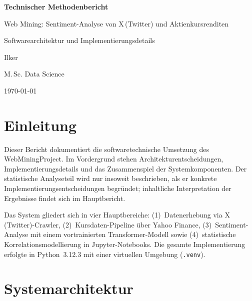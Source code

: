 \documentclass[11pt, a4paper]{article}
\begin{document}

\begin{titlepage}
  \centering
  \vspace*{2cm}
  {\LARGE\bfseries Technischer Methodenbericht\par}
  \vspace{0.8cm}
  {\large Web Mining: Sentiment-Analyse von X\,(Twitter) und Aktienkursrenditen\par}
  \vspace{0.6cm}
  {\normalsize Softwarearchitektur und Implementierungsdetails\par}
  \vspace{2cm}
  {\large Ilker\par}
  \vspace{0.4cm}
  {\normalsize M.\,Sc. Data Science\par}
  \vfill
  {\normalsize \today\par}
\end{titlepage}

\tableofcontents
\newpage

\section{Einleitung}
\label{sec:einleitung}

Dieser Bericht dokumentiert die softwaretechnische Umsetzung des WebMiningProject.
Im Vordergrund stehen Architekturentscheidungen, Implementierungsdetails und das
Zusammenspiel der Systemkomponenten. Der statistische Analyseteil wird nur insoweit
beschrieben, als er konkrete Implementierungsentscheidungen begründet; inhaltliche
Interpretation der Ergebnisse findet sich im Hauptbericht.

Das System gliedert sich in vier Hauptbereiche:
(1)~Datenerhebung via X\,(Twitter)-Crawler,
(2)~Kursdaten-Pipeline über Yahoo Finance,
(3)~Sentiment-Analyse mit einem vortrainierten Transformer-Modell sowie
(4)~statistische Korrelationsmodellierung in Jupyter-Notebooks.
Die gesamte Implementierung erfolgte in Python~3.12.3 mit einer virtuellen
Umgebung (\texttt{.venv}).

\section{Systemarchitektur}
\label{sec:architektur}
\end{document}
